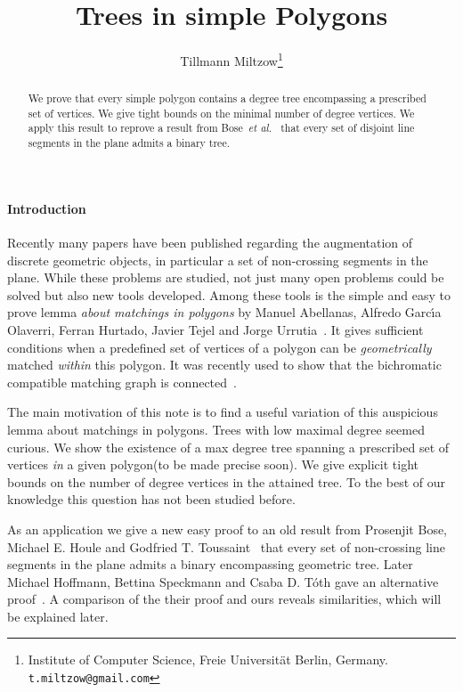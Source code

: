\documentclass[12pt]{article}
\title{Trees in simple Polygons}
\author{ Tillmann Miltzow\footnote{Institute of Computer Science, Freie Universit\"at Berlin, Germany. \texttt{t.miltzow@gmail.com}}}
\date{}
\begin{document}
\maketitle


\begin{abstract} 
	We prove that every simple polygon contains a degree  tree encompassing a prescribed set of vertices.
	We give tight bounds on the minimal number of degree  vertices. We apply this result to reprove a result from Bose~\emph{et al.}~\cite{DBLP:journals/dcg/BoseHT01} that every set of disjoint line segments in the plane admits a binary tree.
\end{abstract}

\paragraph{Introduction}
Recently many papers have been published regarding the augmentation of discrete geometric objects, in particular a set of non-crossing segments in the plane. While these problems are studied, not just many open problems could be solved but also new tools developed. Among these tools is the simple and easy to prove lemma \emph{about matchings in polygons} by Manuel Abellanas, Alfredo Garc\'{\i}a Olaverri, Ferran Hurtado, Javier Tejel and Jorge Urrutia~\cite{DBLP:journals/comgeo/AbellanasOHTU08}. It gives sufficient conditions when a predefined set of vertices of a polygon can be \emph{geometrically} matched \emph{within} this polygon. 
It was recently used to show that the bichromatic compatible matching graph is connected~\cite{2012arXiv1207.2375A}.

The main motivation of this note is to find a useful variation of this auspicious lemma about matchings in polygons. Trees with low maximal degree seemed curious. We show the existence of a max degree  tree spanning a prescribed set of vertices \emph{in} a given polygon(to be made precise soon). We give explicit tight bounds on the number of degree  vertices in the attained tree. To the best of our knowledge this question has not been studied before.

As an application we give a new easy proof to an old result from Prosenjit Bose, Michael E. Houle and Godfried T. Toussaint~\cite{DBLP:journals/dcg/BoseHT01} that every set of non-crossing line segments in the plane admits a binary encompassing geometric tree.
Later Michael Hoffmann, Bettina Speckmann and Csaba D. T\'{o}th gave an alternative proof~\cite{Hoffmann201035}. A comparison of the their proof and ours reveals similarities, which will be explained later. 
\end{document}
